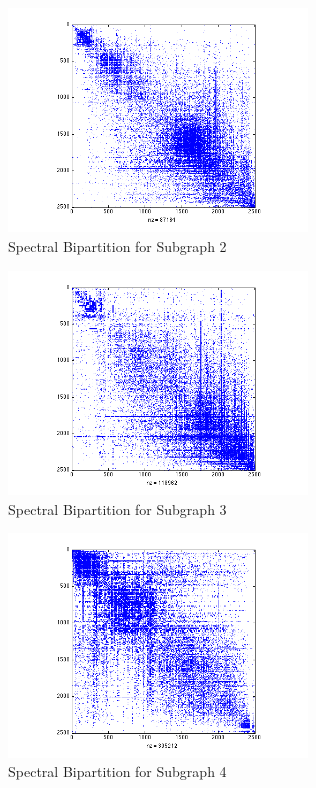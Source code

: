 \documentclass[11pt]{article}
\begin{document}
		 \begin{figure}
		 		\begin{center}
		  		\includegraphics[width=300px]{spectral_partition_a2.png}
		  	\end{center}
		  	\caption{Spectral Bipartition for Subgraph 2}
		  	\label{fig:sb2}
		 \end{figure}
		 
		 \begin{figure}
		 		\begin{center}
		  		\includegraphics[width=300px]{spectral_partition_a3.png}
		  	\end{center}
		  	\caption{Spectral Bipartition for Subgraph 3}
		  	\label{fig:sb3}
		 \end{figure}
		 
		 \begin{figure}
		 		\begin{center}
		  		\includegraphics[width=300px]{spectral_partition_a4.png}
		  	\end{center}
		  	\caption{Spectral Bipartition for Subgraph 4}
		  	\label{fig:sb4}
		 \end{figure}
		 
\end{document}
